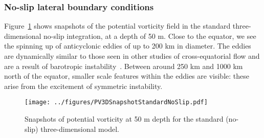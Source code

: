 \subsubsection{No-slip lateral boundary conditions}
Figure~\ref{fig:PVStandardNoSlip3D} shows snapshots of the potential vorticity field in the standard three-dimensional no-slip integration, at a depth of 50 m. Close to the equator, we see the spinning up of anticyclonic eddies of up to 200 km in diameter. The eddies are dynamically similar to those seen in other studies of cross-equatorial flow and are a result of barotropic instability~\citep[e.g.][]{Edwards1998I, Edwards1998II, Jochum2003, Goes2009}. Between around 250 km and 1000 km north of the equator, smaller scale features within the eddies are visible: these arise from the excitement of symmetric instability.

\begin{figure}[p]
    \centering
    \texttt{[image: ../figures/PV3DSnapshotStandardNoSlip.pdf]}
    \caption{Snapshots of potential vorticity at 50 m depth for the standard (no-slip) three-dimensional model.}
    \label{fig:PVStandardNoSlip3D}
\end{figure}

